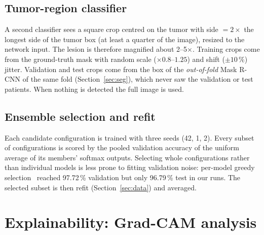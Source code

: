 \documentclass[11pt,a4paper]{article}
\begin{document}
\subsection{Tumor-region classifier}\label{sec:roi}
A second classifier sees a square crop centred on the tumor with side $=2\times$ the longest side of the tumor box (at
least a quarter of the image), resized to the network input. The lesion is therefore magnified about 2--5$\times$.
Training crops come from the ground-truth mask with random scale ($\times0.8$--$1.25$) and shift ($\pm10\,\%$) jitter.
Validation and test crops come from the box of the \emph{out-of-fold} Mask R-CNN of the same fold
(Section~\ref{sec:seg}), which never saw the validation or test patients. When nothing is detected the full image
is used.

\subsection{Ensemble selection and refit}\label{sec:selection}
Each candidate configuration is trained with three seeds (42, 1, 2). Every subset of configurations is scored by the
pooled validation accuracy of the uniform average of its members' softmax outputs. Selecting whole configurations
rather than individual models is less prone to fitting validation noise: per-model greedy selection~\cite{caruana2004}
reached 97.72\,\% validation but only 96.79\,\% test in our runs. The selected subset is then refit
(Section~\ref{sec:data}) and averaged.

\section{Explainability: Grad-CAM analysis}\label{sec:gradcam}
\end{document}
